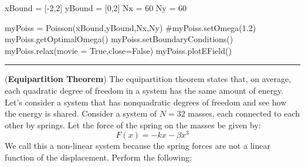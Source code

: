 \begin{enumerate}
\begin{codeexample}
\begin{VerbatimOut}{\listingFile}
xBound = [-2,2]
yBound = [0,2]
Nx = 60
Ny = 60

myPoiss = Poisson(xBound,yBound,Nx,Ny)
#myPoiss.setOmega(1.2)
myPoiss.getOptimalOmega()
myPoiss.setBoundaryConditions()
myPoiss.relax(movie = True,close=False)
myPoiss.plotEField()
\end{VerbatimOut}
\end{codeexample}
\else
\noindent\rule{5 in}{0.01 in}
\fi

\prob (\textbf{Equipartition Theorem}) The
equipartition theorem states that, on average, each quadratic degree of
freedom in a system has the same amount of energy.  Let's consider a system that
has nonquadratic degrees of freedom and see how the energy is shared.
Consider a system of $N = 32$ masses, each connected to each other by
springs.  Let the force of the spring on the masses be given by:
\begin{equation}
F(x) = - k x - \beta x^3
\end{equation} 
We call this a non-linear system because the spring forces are not a
linear function of the displacement.  Perform the following:


\end{enumerate}
